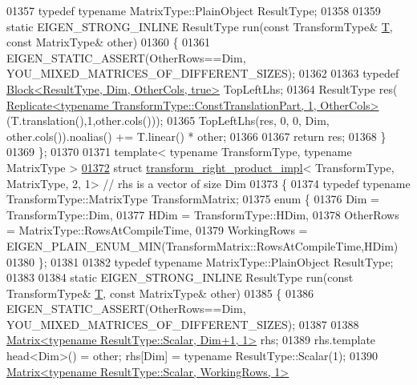 \begin{DoxyCode}
01357   \textcolor{keyword}{typedef} \textcolor{keyword}{typename} MatrixType::PlainObject ResultType;
01358 
01359   \textcolor{keyword}{static} EIGEN\_STRONG\_INLINE ResultType run(\textcolor{keyword}{const} TransformType& \hyperlink{group___sparse_core___module}{T}, \textcolor{keyword}{const} MatrixType& other)
01360   \{
01361     EIGEN\_STATIC\_ASSERT(OtherRows==Dim, YOU\_MIXED\_MATRICES\_OF\_DIFFERENT\_SIZES);
01362 
01363     \textcolor{keyword}{typedef} \hyperlink{group___core___module_class_eigen_1_1_block}{Block<ResultType, Dim, OtherCols, true>} TopLeftLhs;
01364     ResultType res(
      \hyperlink{group___core___module_class_eigen_1_1_replicate}{Replicate<typename TransformType::ConstTranslationPart, 1, OtherCols>}
      (T.translation(),1,other.cols()));
01365     TopLeftLhs(res, 0, 0, Dim, other.cols()).noalias() += T.linear() * other;
01366 
01367     \textcolor{keywordflow}{return} res;
01368   \}
01369 \};
01370 
01371 \textcolor{keyword}{template}< \textcolor{keyword}{typename} TransformType, \textcolor{keyword}{typename} MatrixType >
\hyperlink{struct_eigen_1_1internal_1_1transform__right__product__impl_3_01_transform_type_00_01_matrix_type_00_012_00_011_01_4}{01372} \textcolor{keyword}{struct }\hyperlink{struct_eigen_1_1internal_1_1transform__right__product__impl}{transform\_right\_product\_impl}< TransformType, MatrixType, 2, 1> \textcolor{comment}{// rhs is
       a vector of size Dim}
01373 \{
01374   \textcolor{keyword}{typedef} \textcolor{keyword}{typename} TransformType::MatrixType TransformMatrix;
01375   \textcolor{keyword}{enum} \{
01376     Dim = TransformType::Dim,
01377     HDim = TransformType::HDim,
01378     OtherRows = MatrixType::RowsAtCompileTime,
01379     WorkingRows = EIGEN\_PLAIN\_ENUM\_MIN(TransformMatrix::RowsAtCompileTime,HDim)
01380   \};
01381 
01382   \textcolor{keyword}{typedef} \textcolor{keyword}{typename} MatrixType::PlainObject ResultType;
01383 
01384   \textcolor{keyword}{static} EIGEN\_STRONG\_INLINE ResultType run(\textcolor{keyword}{const} TransformType& \hyperlink{group___sparse_core___module}{T}, \textcolor{keyword}{const} MatrixType& other)
01385   \{
01386     EIGEN\_STATIC\_ASSERT(OtherRows==Dim, YOU\_MIXED\_MATRICES\_OF\_DIFFERENT\_SIZES);
01387 
01388     \hyperlink{group___core___module_class_eigen_1_1_matrix}{Matrix<typename ResultType::Scalar, Dim+1, 1>} rhs;
01389     rhs.template head<Dim>() = other; rhs[Dim] = \textcolor{keyword}{typename} ResultType::Scalar(1);
01390     \hyperlink{group___core___module_class_eigen_1_1_matrix}{Matrix<typename ResultType::Scalar, WorkingRows, 1>} 

\end{DoxyCode}
